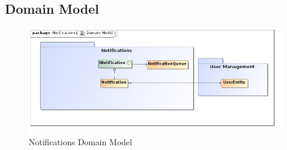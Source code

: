 \documentclass[11pt,a4paper]{article}
\begin{document}
\subsection{Domain Model}
\begin{figure}[H]
	\begin{center}
		\includegraphics[scale=0.55]{../Images/Notifications Domain Model.jpg}
		\caption{Notifications Domain Model}
	\end{center}
\end{figure}
\end{document}
